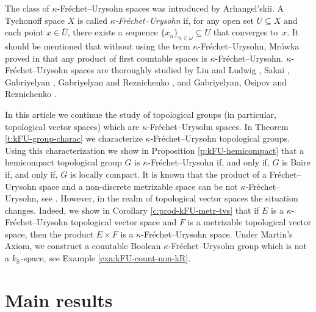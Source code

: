 \documentclass[preprint,11pt]{elsarticle}
\theoremstyle{definition}
\theoremstyle{remark}
\numberwithin{equation}{section}
\numberwithin{theorem}{section}
\newcommand{\w}{\omega}
\newcommand{\IR}{\mathbb{R}}
\begin{document}

The class of $\kappa$-Fr\'{e}chet--Urysohn spaces was introduced by Arhangel'skii. A Tychonoff space $X$ is called {\em $\kappa$-Fr\'{e}chet--Urysohn} if, for any open set $U\subseteq X$ and each point $x\in \overline{U}$, there exists a sequence $\{x_n\}_{n\in \w}\subseteq U$ that converges to~$x$. It should be mentioned that without using the term $\kappa$-Fr\'{e}chet--Urysohn, Mr\'{o}wka proved in \cite{Mrowka} that any product of first countable spaces is  $\kappa$-Fr\'{e}chet--Urysohn. $\kappa$-Fr\'{e}chet--Urysohn spaces are thoroughly studied by Liu and Ludwig \cite{LiL}, Sakai \cite{Sak2,Sakai}, Gabriyelyan \cite{Gabr-B1,Gabr-seq-Ascoli}, Gabriyelyan and Reznichenko \cite{GR-compact}, and Gabriyelyan, Osipov and Reznichenko \cite{GOR-Baire}.

In this article we continue the study of topological groups (in particular, topological vector spaces) which are $\kappa$-Fr\'{e}chet--Urysohn spaces. In Theorem \ref{t:kFU-group-charac} we characterize $\kappa$-Fr\'{e}chet--Urysohn topological groups. Using this characterization we show in Proposition \ref{p:kFU-hemicompact} that a hemicompact topological group $G$ is $\kappa$-Fr\'{e}chet--Urysohn if, and only if, $G$ is Baire if, and only if, $G$ is locally compact. It is known that the product of a Fr\'{e}chet--Urysohn space and a non-discrete metrizable space can be not $\kappa$-Fr\'{e}chet--Urysohn, see \cite{GR-compact}. However, in the realm of topological vector spaces the situation changes. Indeed, we show in Corollary \ref{c:prod-kFU-metr-tvs} that if $E$ is a $\kappa$-Fr\'{e}chet--Urysohn topological vector space and $F$ is a metrizable topological vector space, then the product $E\times F$ is a $\kappa$-Fr\'{e}chet--Urysohn space. Under Martin's Axiom, we construct a countable Boolean $\kappa$-Fr\'{e}chet--Urysohn group which is not a $k_\IR$-space, see Example \ref{exa:kFU-count-non-kR}.


\section{Main results} \label{sec:kFU-charac}

\end{document}
